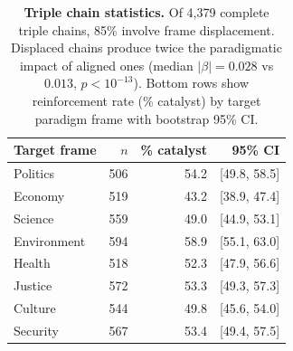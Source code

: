 \begin{table}[h]
\centering
\renewcommand{\arraystretch}{1.15}
\caption{\textbf{Triple chain statistics.}
Of 4,379 complete triple chains,
85\% involve frame displacement.
Displaced chains produce twice the paradigmatic impact of aligned ones
(median $|\beta| = 0.028$ vs
$0.013$, $p < 10^{-13}$).
Bottom rows show reinforcement rate (\% catalyst)
by target paradigm frame with bootstrap 95\% CI.}
\label{tab:si_triple_stats}
\vspace{0.3em}
\small
\begin{tabular}{@{}l r r r@{}}
\toprule
Target frame & $n$ & \% catalyst & 95\% CI \\
\midrule
Politics & 506 & 54.2 & [49.8, 58.5] \\
Economy & 519 & 43.2 & [38.9, 47.4] \\
Science & 559 & 49.0 & [44.9, 53.1] \\
Environment & 594 & 58.9 & [55.1, 63.0] \\
Health & 518 & 52.3 & [47.9, 56.6] \\
Justice & 572 & 53.3 & [49.3, 57.3] \\
Culture & 544 & 49.8 & [45.6, 54.0] \\
Security & 567 & 53.4 & [49.4, 57.5] \\
\bottomrule
\end{tabular}
\end{table}